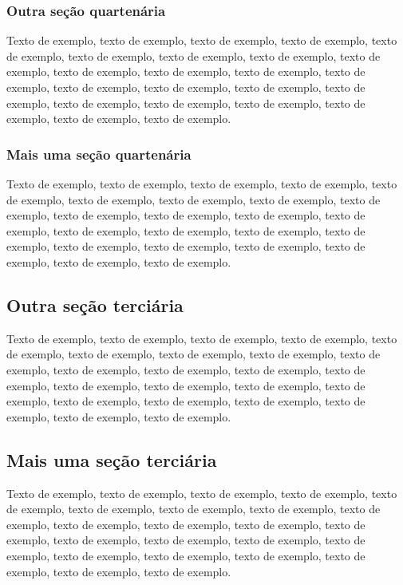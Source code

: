 \documentclass[
	12pt,				%
	oneside,			%
	a4paper,			%
	english,			%
	brazil				%
	]{abntex2ppgsi}
\begin{document}
\subsubsection{Outra seção quartenária}

Texto de exemplo, texto de exemplo, texto de exemplo, texto de exemplo, texto de exemplo, texto de exemplo, texto de exemplo, texto de exemplo, texto de exemplo, texto de exemplo, texto de exemplo, texto de exemplo, texto de exemplo, texto de exemplo, texto de exemplo, texto de exemplo, texto de exemplo, texto de exemplo, texto de exemplo, texto de exemplo, texto de exemplo, texto de exemplo, texto de exemplo.

\subsubsection{Mais uma seção quartenária}

Texto de exemplo, texto de exemplo, texto de exemplo, texto de exemplo, texto de exemplo, texto de exemplo, texto de exemplo, texto de exemplo, texto de exemplo, texto de exemplo, texto de exemplo, texto de exemplo, texto de exemplo, texto de exemplo, texto de exemplo, texto de exemplo, texto de exemplo, texto de exemplo, texto de exemplo, texto de exemplo, texto de exemplo, texto de exemplo, texto de exemplo.

\subsection{Outra seção terciária}

Texto de exemplo, texto de exemplo, texto de exemplo, texto de exemplo, texto de exemplo, texto de exemplo, texto de exemplo, texto de exemplo, texto de exemplo, texto de exemplo, texto de exemplo, texto de exemplo, texto de exemplo, texto de exemplo, texto de exemplo, texto de exemplo, texto de exemplo, texto de exemplo, texto de exemplo, texto de exemplo, texto de exemplo, texto de exemplo, texto de exemplo.

\subsection{Mais uma seção terciária}

Texto de exemplo, texto de exemplo, texto de exemplo, texto de exemplo, texto de exemplo, texto de exemplo, texto de exemplo, texto de exemplo, texto de exemplo, texto de exemplo, texto de exemplo, texto de exemplo, texto de exemplo, texto de exemplo, texto de exemplo, texto de exemplo, texto de exemplo, texto de exemplo, texto de exemplo, texto de exemplo, texto de exemplo, texto de exemplo, texto de exemplo.
\end{document}
